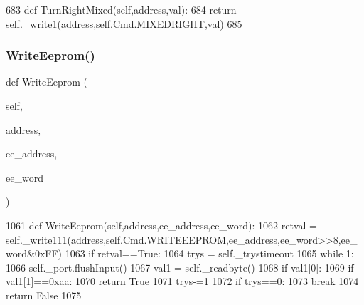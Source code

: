 \begin{DoxyCode}
683     \textcolor{keyword}{def }TurnRightMixed(self,address,val):
684         \textcolor{keywordflow}{return} self.\_write1(address,self.Cmd.MIXEDRIGHT,val)
685 
\end{DoxyCode}
\mbox{\label{classtoxic__hardware_1_1roboclaw__3_1_1Roboclaw_a6e8d1950fa135f3841c1aed277643c2e}} 
\subsubsection{\texorpdfstring{Write\+Eeprom()}{WriteEeprom()}}
{\footnotesize\ttfamily def Write\+Eeprom (\begin{DoxyParamCaption}\item[{}]{self,  }\item[{}]{address,  }\item[{}]{ee\+\_\+address,  }\item[{}]{ee\+\_\+word }\end{DoxyParamCaption})}


\begin{DoxyCode}
1061     \textcolor{keyword}{def }WriteEeprom(self,address,ee\_address,ee\_word):
1062         retval = self.\_write111(address,self.Cmd.WRITEEEPROM,ee\_address,ee\_word>>8,ee\_word&0xFF)
1063         \textcolor{keywordflow}{if} retval==\textcolor{keyword}{True}:
1064             trys = self.\_trystimeout
1065             \textcolor{keywordflow}{while} 1:
1066                 self.\_port.flushInput()
1067                 val1 = self.\_readbyte()
1068                 \textcolor{keywordflow}{if} val1[0]:
1069                     \textcolor{keywordflow}{if} val1[1]==0xaa:
1070                         \textcolor{keywordflow}{return} \textcolor{keyword}{True}
1071                 trys-=1
1072                 \textcolor{keywordflow}{if} trys==0:
1073                     \textcolor{keywordflow}{break}
1074         \textcolor{keywordflow}{return} \textcolor{keyword}{False}    
1075         
\end{DoxyCode}
\mbox{\label{classtoxic__hardware_1_1roboclaw__3_1_1Roboclaw_ab727e2cb1e1d5962f9d52c7af8524ede}} 

